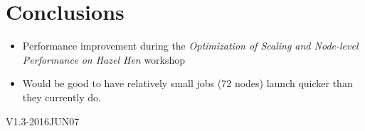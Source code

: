 \documentclass [a4paper, 12pt]{article}
\begin{document}
\section{Conclusions}

\begin{itemize}
	\item Performance improvement during the
		\textit{Optimization of Scaling and Node-level Performance on Hazel Hen} workshop
	\item Would be good to have relatively small jobs (72 nodes) launch quicker than they currently do.
\end{itemize}

\newpage




\bigskip
\begin{flushright}
{\tiny V1.3-2016JUN07}
\end{flushright}
\end{document}
